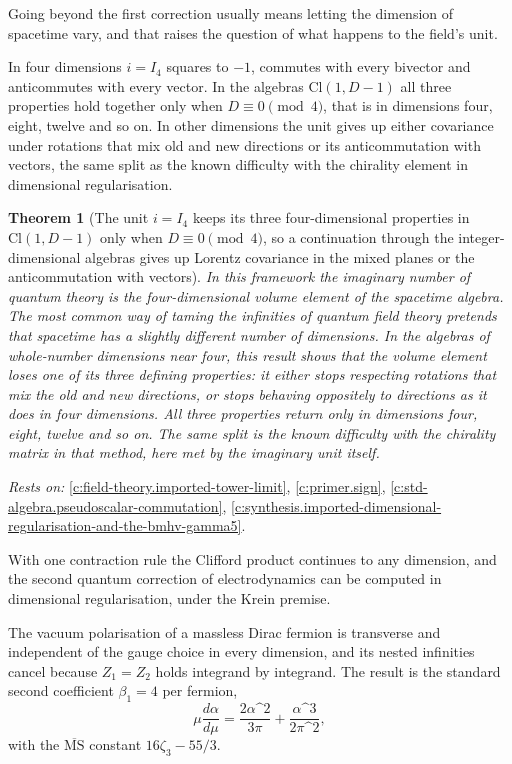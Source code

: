 \documentclass[11pt]{article}
\newtheorem{theorem}{Theorem}[section]
\theoremstyle{definition}
\theoremstyle{plain}
\providecommand{\Cl}{}\renewcommand{\Cl}{\mathrm{Cl}}
\begin{document}
Going beyond the first correction usually means letting the dimension of spacetime vary, and that raises the question of what happens to the field's unit.

In four dimensions $i = I_4$ squares to $-1$, commutes with every bivector and anticommutes with every vector. In the algebras $\Cl(1, D-1)$ all three properties hold together only when $D \equiv 0 \pmod 4$, that is in dimensions four, eight, twelve and so on. In other dimensions the unit gives up either covariance under rotations that mix old and new directions or its anticommutation with vectors, the same split as the known difficulty with the chirality element in dimensional regularisation.

\begin{theorem}[The unit $i = I_4$ keeps its three four-dimensional properties in $\Cl(1, D-1)$ only when $D \equiv 0 \pmod 4$, so a continuation through the integer-dimensional algebras gives up Lorentz covariance in the mixed planes or the anticommutation with vectors]\label{c:synthesis.unit-i4-keeps-its-three-properties-only-in-dimension-zero-mod-four}
In this framework the imaginary number of quantum theory is the four-dimensional volume element of the spacetime algebra. The most common way of taming the infinities of quantum field theory pretends that spacetime has a slightly different number of dimensions. In the algebras of whole-number dimensions near four, this result shows that the volume element loses one of its three defining properties: it either stops respecting rotations that mix the old and new directions, or stops behaving oppositely to directions as it does in four dimensions. All three properties return only in dimensions four, eight, twelve and so on. The same split is the known difficulty with the chirality matrix in that method, here met by the imaginary unit itself.
\end{theorem}
\noindent\emph{Rests on:} \ref{c:field-theory.imported-tower-limit}, \ref{c:primer.sign}, \ref{c:std-algebra.pseudoscalar-commutation}, \ref{c:synthesis.imported-dimensional-regularisation-and-the-bmhv-gamma5}.

With one contraction rule the Clifford product continues to any dimension, and the second quantum correction of electrodynamics can be computed in dimensional regularisation, under the Krein premise.

The vacuum polarisation of a massless Dirac fermion is transverse and independent of the gauge choice in every dimension, and its nested infinities cancel because $Z_{1} = Z_{2}$ holds integrand by integrand. The result is the standard second coefficient $\beta_{1} = 4$ per fermion, \[ \mu\frac{d\alpha}{d\mu} = \frac{2\alpha\^{}{2}}{3\pi} + \frac{\alpha\^{}{3}}{2\pi\^{}{2}} , \] with the $\overline{\mathrm{MS}}$ constant $16\zeta_{3} - 55/3$.
\end{document}
